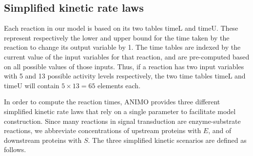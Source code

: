 \subsection{Simplified kinetic rate laws}\label{subsec:kinetic-scenarios}
Each reaction in our model is based on its two tables {\sf timeL} and {\sf timeU}. These represent
respectively the lower and upper bound for the time taken by the reaction to change its output variable by 1.
The time tables are indexed by the current value of the input variables for that reaction, and are pre-computed
based on all possible values of those inputs. Thus, if a reaction has two input variables with
5 and 13 possible activity levels respectively, the two time tables {\sf timeL} and
{\sf timeU} will contain $5 \times 13 = 65$ elements each.

In order to compute the reaction times,
ANIMO provides three different simplified kinetic rate laws that rely on a single parameter to facilitate model construction.
Since many reactions in signal transduction are enzyme-substrate reactions,
we abbreviate concentrations of upstream proteins with $E$, and of downstream proteins with $S$.
The three simplified kinetic scenarios are defined as follows.

